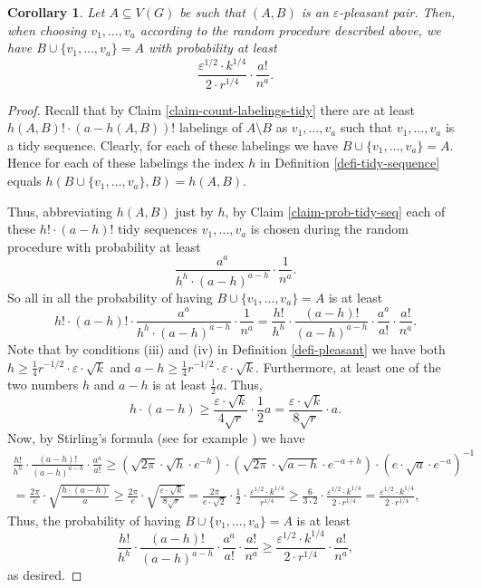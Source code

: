 \documentclass[11pt]{article}
\newtheorem{corollary}[theorem]{Corollary}
\theoremstyle{definition}
\numberwithin{equation}{section}
\begin{document}
\begin{corollary}\label{coro-A-pleasant} Let $A\subseteq V(G)$ be such that $(A,B)$ is an $\varepsilon$-pleasant pair. Then, when choosing $v_1,\dots,v_a$ according to the random procedure described above, we have $B\cup \lbrace v_1,\dots,v_a\rbrace=A$ with probability at least
\[\frac{\varepsilon^{1/2}\cdot k^{1/4}}{2\cdot r^{1/4}}\cdot \frac{a!}{n^a}.\]
\end{corollary}
\begin{proof}
Recall that by Claim \ref{claim-count-labelings-tidy} there are at least $h(A,B)!\cdot (a-h(A,B))!$ labelings of $A\setminus B$ as $v_1,\dots,v_a$ such that $v_1,\dots,v_a$ is a tidy sequence.  Clearly, for each of these labelings we have $B\cup \lbrace v_1,\dots,v_a\rbrace=A$. Hence for each of these labelings the index $h$ in Definition \ref{defi-tidy-sequence} equals $h(B\cup \lbrace v_1,\dots,v_a\rbrace,B)=h(A,B)$.

Thus, abbreviating $h(A,B)$ just by $h$, by Claim \ref{claim-prob-tidy-seq} each of these $h!\cdot (a-h)!$ tidy sequences $v_1,\dots,v_a$ is chosen during the random procedure with probability at least
\[\frac{a^a}{h^h\cdot (a-h)^{a-h}}\cdot \frac{1}{n^a}.\]
So all in all the probability of having $B\cup \lbrace v_1,\dots,v_a\rbrace=A$ is at least
\[h!\cdot (a-h)!\cdot \frac{a^a}{h^h\cdot (a-h)^{a-h}}\cdot \frac{1}{n^a}=\frac{h!}{h^h}\cdot \frac{(a-h)!}{(a-h)^{a-h}}\cdot \frac{a^a}{a!}\cdot \frac{a!}{n^a}.\]
Note that by conditions (iii) and (iv) in Definition \ref{defi-pleasant} we have both $h\geq \frac{1}{4}r^{-1/2}\cdot \varepsilon\cdot \sqrt{k}$ and $a-h\geq \frac{1}{4}r^{-1/2}\cdot \varepsilon\cdot \sqrt{k}$. Furthermore, at least one of the two numbers $h$ and $a-h$ is at least $\frac{1}{2}a$. Thus,
\[h\cdot (a-h)\geq \frac{\varepsilon\cdot \sqrt{k}}{4\sqrt{r}} \cdot \frac{1}{2}a=\frac{\varepsilon\cdot \sqrt{k}}{8\sqrt{r}} \cdot a.\]
Now, by Stirling's formula (see for example \cite{robbins}) we have
\begin{multline*}
\frac{h!}{h^h}\cdot \frac{(a-h)!}{(a-h)^{a-h}}\cdot \frac{a^a}{a!}\geq 
\left(\sqrt{2\pi}\cdot \sqrt{h}\cdot e^{-h}\right)\cdot \left(\sqrt{2\pi}\cdot \sqrt{a-h}\cdot e^{-a+h}\right)\cdot \left(e\cdot \sqrt{a}\cdot e^{-a}\right)^{-1}\\
=\frac{2\pi}{e}\cdot \sqrt{\frac{h\cdot (a-h)}{a}}\geq \frac{2\pi}{e}\cdot \sqrt{\frac{\varepsilon\cdot \sqrt{k}}{8\sqrt{r}}}=\frac{2\pi}{e\cdot \sqrt{2}}\cdot \frac{1}{2}\cdot \frac{\varepsilon^{1/2}\cdot k^{1/4}}{r^{1/4}}\geq \frac{6}{3\cdot 2}\cdot  \frac{\varepsilon^{1/2}\cdot k^{1/4}}{2\cdot r^{1/4}}=\frac{\varepsilon^{1/2}\cdot k^{1/4}}{2\cdot r^{1/4}},
\end{multline*}
Thus, the probability of having $B\cup \lbrace v_1,\dots,v_a\rbrace=A$ is at least
\[\frac{h!}{h^h}\cdot \frac{(a-h)!}{(a-h)^{a-h}}\cdot \frac{a^a}{a!}\cdot \frac{a!}{n^a}\geq\frac{\varepsilon^{1/2}\cdot k^{1/4}}{2\cdot r^{1/4}}\cdot \frac{a!}{n^a},\]
as desired.
\end{proof}
\end{document}
